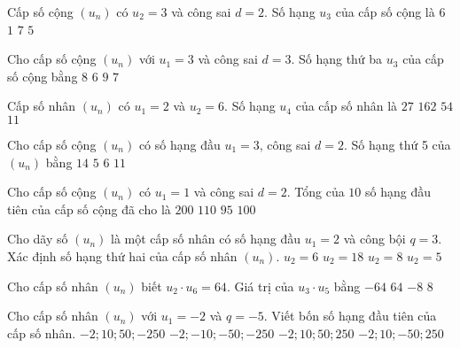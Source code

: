 \begin{ex}
Cấp số cộng $(u_n)$ có $u_2=3$ và công sai $d=2$. Số hạng $u_3$ của cấp số cộng là
\choice
{$6$}
{$1$}
{$7$}
{\True $5$}
\end{ex}
\begin{ex}
Cho cấp số cộng $(u_n)$ với $u_1=3$ và công sai $d=3$. Số hạng thứ ba $u_3$ của cấp số cộng bằng
\choice
{$8$}
{$6$}
{\True $9$}
{$7$}
\end{ex}
\begin{ex}
Cấp số nhân $(u_n)$ có $u_1=2$ và $u_2=6$. Số hạng $u_4$ của cấp số nhân là
\choice
{\True $27$}
{$162$}
{$54$}
{$11$}
\end{ex}
\begin{ex}
Cho cấp số cộng $(u_n)$ có số hạng đầu $u_1=3$, công sai $d=2$. Số hạng thứ 5 của $(u_n)$ bằng
\choice
{$14$}
{$5$}
{$6$}
{\True $11$}
\end{ex}
\begin{ex}
Cho cấp số cộng $(u_n)$ có $u_1=1$ và công sai $d=2$. Tổng của $10$ số hạng đầu tiên của cấp số cộng đã cho là 
\choice
{$200$}
{$110$}
{$95$}
{\True $100$}
\end{ex}
\begin{ex}
Cho dãy số $(u_n)$ là một cấp số nhân có số hạng đầu $u_1=2$ và công bội $q=3$. Xác định số hạng thứ hai của cấp số nhân $(u_n)$.
\choice
{\True $u_2=6$}
{$u_2=18$}
{$u_2=8$}
{$u_2=5$}
\end{ex}
\begin{ex}
Cho cấp số nhân $(u_n)$ biết $u_2 \cdot u_6=64$. Giá trị của $u_3 \cdot u_5$ bằng
\choice
{$-64$}
{\True $64$}
{$-8$}
{$8$}
\end{ex}
\begin{ex}
Cho cấp số nhân $(u_n)$ với $u_1=-2$ và $q=-5$. Viết bốn số hạng đầu tiên của cấp số nhân.
\choice
{$-2;10;50;-250$}
{$-2;-10;-50;-250$}
{$-2;10;50;250$}
{\True $-2;10;-50;250$}
\end{ex}
